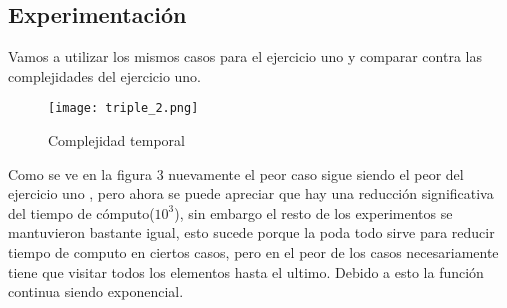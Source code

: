 \subsection{Experimentación}
Vamos a utilizar los mismos casos para el ejercicio uno y comparar contra las complejidades del ejercicio uno.
\begin{figure}[h]
    \centering
    \texttt{[image: triple\_2.png]}
    \caption{Complejidad temporal}
    \label{fig:mesh1}
\end{figure}
Como se ve en la figura 3 nuevamente el peor caso sigue siendo el peor del ejercicio uno , pero ahora se puede apreciar que hay una reducción significativa
del tiempo de cómputo($10^3$), sin embargo el resto de los experimentos se mantuvieron bastante igual, esto sucede porque la poda todo sirve para reducir
tiempo de computo en ciertos casos, pero en el peor de los casos necesariamente tiene que visitar todos los elementos hasta el ultimo. Debido a esto
 la función continua siendo exponencial.
